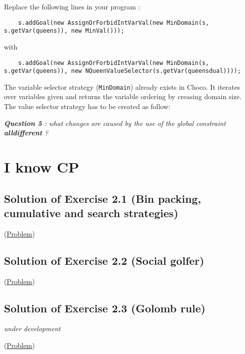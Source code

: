 Replace the following lines in your program :
\begin{lstlisting}
	s.addGoal(new AssignOrForbidIntVarVal(new MinDomain(s, s.getVar(queens)), new MinVal()));
\end{lstlisting}
with
\begin{lstlisting}
	s.addGoal(new AssignOrForbidIntVarVal(new MinDomain(s, s.getVar(queens)), new NQueenValueSelector(s.getVar(queensdual))));
\end{lstlisting}
The variable selector strategy (\texttt{MinDomain}) already exists in Choco. It iterates over variables given and returns the variable ordering by creasing domain size. 
The value selector strategy has to be created as follow:


\noindent\emph{\textbf{Question 5} : what changes are caused by the use of the global constraint \textbf{alldifferent} ?}



\section{I know CP}\label{solutions:iknowcp}\hypertarget{solutions:iknowcp}{}

\subsection{Solution of Exercise 2.1 (Bin packing, cumulative and search strategies)}\label{solutions:solutionofexercise2.1}\hypertarget{solutions:solutionofexercise2.1}{}
(\hyperlink{exercises:exercise2.1}{Problem})

\subsection{Solution of Exercise 2.2 (Social golfer)}\label{solutions:solutionofexercise2.2}\hypertarget{solutions:solutionofexercise2.2}{}
(\hyperlink{exercises:exercise2.2}{Problem})

\subsection{Solution of Exercise 2.3 (Golomb rule)}\label{solutions:solutionofexercise2.3}\hypertarget{solutions:solutionofexercise2.3}{}

\emph{under development}

(\hyperlink{exercises:exercise2.3}{Problem})

